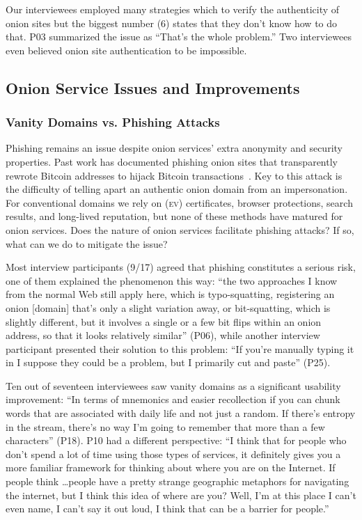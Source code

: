 Our interviewees employed many strategies which to verify the authenticity of
onion sites but the biggest number (6) states that they don't know how to do
that.  P03 summarized the issue as ``That's the whole problem.'' Two
interviewees even believed onion site authentication to be impossible.

\subsection{Onion Service Issues and Improvements}
\label{sec:improve}

\subsubsection{Vanity Domains vs. Phishing Attacks}

Phishing remains an issue despite onion services' extra anonymity and security
properties.  Past work has documented phishing onion sites that transparently
rewrote Bitcoin addresses to hijack Bitcoin
transactions~\cite{Winter2016a,Nurmi2015a,Monteiro2016a}.  Key to this attack is
the difficulty of telling apart an authentic onion domain from an impersonation.
For conventional domains we rely on (\textsc{ev}) certificates, browser
protections, search results, and long-lived reputation, but none of these
methods have matured for onion services.  Does the nature of onion services
facilitate phishing attacks?  If so, what can we do to mitigate the issue?

Most interview participants (9/17) agreed that phishing constitutes a serious
risk, one of them explained the phenomenon this way: ``the two approaches I know
from the normal Web still apply here, which is typo-squatting, registering an
onion [domain] that's only a slight variation away, or bit-squatting, which is
slightly different, but it involves a single or a few bit flips within an onion
address, so that it looks relatively similar'' (P06), while another interview
participant presented their solution to this problem: ``If you're manually
typing it in I suppose they could be a problem, but I primarily cut and paste''
(P25).

Ten out of seventeen interviewees saw vanity domains as a significant usability
improvement: ``In terms of mnemonics and easier recollection if you can chunk
words that are associated with daily life and not just a random.  If there's
entropy in the stream, there's no way I'm going to remember that more than a few
characters'' (P18).  P10 had a different perspective: ``I think that for people
who don't spend a lot of time using those types of services, it definitely gives
you a more familiar framework for thinking about where you are on the Internet.
If people think \ldots people have a pretty strange geographic metaphors for
navigating the internet, but I think this idea of where are you?  Well, I'm at
this place I can't even name, I can't say it out loud, I think that can be a
barrier for people.''

